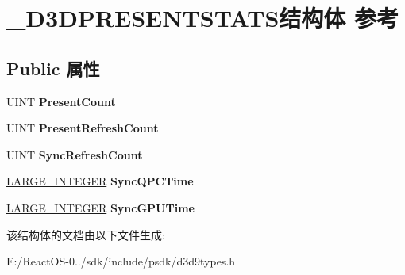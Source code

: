 \hypertarget{struct___d3_d_p_r_e_s_e_n_t_s_t_a_t_s}{}\section{\+\_\+\+D3\+D\+P\+R\+E\+S\+E\+N\+T\+S\+T\+A\+T\+S结构体 参考}
\label{struct___d3_d_p_r_e_s_e_n_t_s_t_a_t_s}
\subsection*{Public 属性}
\begin{DoxyCompactItemize}
\item 
\mbox{\label{struct___d3_d_p_r_e_s_e_n_t_s_t_a_t_s_a17dc584c2e11c6b4868cab51076c5add}} 
U\+I\+NT {\bfseries Present\+Count}
\item 
\mbox{\label{struct___d3_d_p_r_e_s_e_n_t_s_t_a_t_s_af3c4470324bfa0921265a034e409f27c}} 
U\+I\+NT {\bfseries Present\+Refresh\+Count}
\item 
\mbox{\label{struct___d3_d_p_r_e_s_e_n_t_s_t_a_t_s_a4e732a64f3673422bb4ea0d305465262}} 
U\+I\+NT {\bfseries Sync\+Refresh\+Count}
\item 
\mbox{\label{struct___d3_d_p_r_e_s_e_n_t_s_t_a_t_s_aa8aebd87fe2213a325e8ef97a41d3874}} 
\hyperlink{union___l_a_r_g_e___i_n_t_e_g_e_r}{L\+A\+R\+G\+E\+\_\+\+I\+N\+T\+E\+G\+ER} {\bfseries Sync\+Q\+P\+C\+Time}
\item 
\mbox{\label{struct___d3_d_p_r_e_s_e_n_t_s_t_a_t_s_a88ded71d1f23157964a188726907558e}} 
\hyperlink{union___l_a_r_g_e___i_n_t_e_g_e_r}{L\+A\+R\+G\+E\+\_\+\+I\+N\+T\+E\+G\+ER} {\bfseries Sync\+G\+P\+U\+Time}
\end{DoxyCompactItemize}


该结构体的文档由以下文件生成\+:\begin{DoxyCompactItemize}
\item 
E\+:/\+React\+O\+S-\/0../sdk/include/psdk/d3d9types.\+h\end{DoxyCompactItemize}
